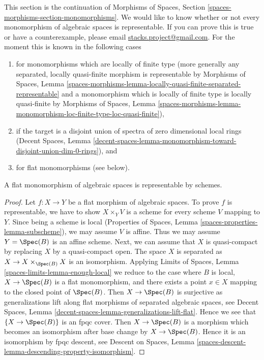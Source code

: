 \noindent
This section is the continuation of
Morphisms of Spaces, Section \ref{spaces-morphisms-section-monomorphisms}.
We would like to know whether or not every monomorphism of algebraic
spaces is representable. If you can prove this is true or have a
counterexample, please email
\href{mailto:stacks.project@gmail.com}{stacks.project@gmail.com}.
For the moment this is known in the following cases
\begin{enumerate}
\item for monomorphisms which are locally of finite type
(more generally any separated, locally quasi-finite morphism
is representable by Morphisms of Spaces, Lemma
\ref{spaces-morphisms-lemma-locally-quasi-finite-separated-representable}
and a monomorphism which is locally of finite type is
locally quasi-finite by Morphisms of Spaces, Lemma
\ref{spaces-morphisms-lemma-monomorphism-loc-finite-type-loc-quasi-finite}),
\item if the target is a disjoint union of spectra of zero dimensional
local rings (Decent Spaces, Lemma
\ref{decent-spaces-lemma-monomorphism-toward-disjoint-union-dim-0-rings}), and
\item for flat monomorphisms (see below).
\end{enumerate}

\begin{lemma}
\label{lemma-flat-case}
A flat monomorphism of algebraic spaces is representable by schemes.
\end{lemma}

\begin{proof}
Let $f : X \to Y$ be a flat morphism of algebraic spaces.
To prove $f$ is representable, we have to show
$X \times_Y V$ is a scheme for every scheme $V$ mapping to $Y$.
Since being a scheme is local (Properties of Spaces, 
Lemma \ref{spaces-properties-lemma-subscheme}), we may
assume $V$ is affine. Thus we may assume $Y = \Spec(B)$
is an affine scheme. Next, we can assume that $X$ is quasi-compact
by replacing $X$ by a quasi-compact open. The space $X$ is
separated as $X \to X \times_{\Spec(B)} X$ is an isomorphism.
Applying Limits of Spaces, Lemma \ref{spaces-limits-lemma-enough-local}
we reduce to the case where $B$ is local, $X \to \Spec(B)$ is a
flat monomorphism, and
there exists a point $x \in X$ mapping to the closed point of $\Spec(B)$.
Then $X \to \Spec(B)$ is surjective as generalizations
lift along flat morphisms of separated algebraic spaces, see
Decent Spaces, Lemma \ref{decent-spaces-lemma-generalizations-lift-flat}.
Hence we see that $\{X \to \Spec(B)\}$ is an fpqc cover.
Then $X \to \Spec(B)$ is a morphism which becomes an isomorphism
after base change by $X \to \Spec(B)$. Hence it is an isomorphism by
fpqc descent, see Descent on Spaces, Lemma
\ref{spaces-descent-lemma-descending-property-isomorphism}.
\end{proof}


